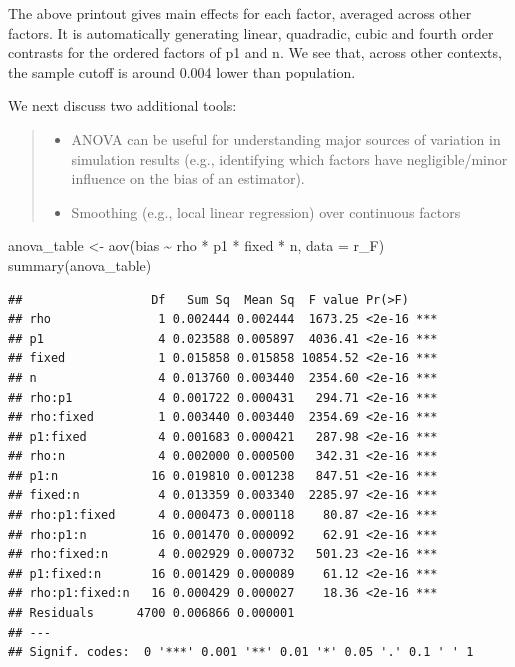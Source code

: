 \documentclass[
]{book}
\newenvironment{Shaded}{\begin{snugshade}}{\end{snugshade}}
\newcommand{\AttributeTok}[1]{\textcolor[rgb]{0.77,0.63,0.00}{#1}}
\newcommand{\FunctionTok}[1]{\textcolor[rgb]{0.00,0.00,0.00}{#1}}
\newcommand{\NormalTok}[1]{#1}
\newcommand{\OtherTok}[1]{\textcolor[rgb]{0.56,0.35,0.01}{#1}}
\newcommand{\SpecialCharTok}[1]{\textcolor[rgb]{0.00,0.00,0.00}{#1}}
\providecommand{\tightlist}{%
  \setlength{\itemsep}{0pt}\setlength{\parskip}{0pt}}
\begin{document}
The above printout gives main effects for each factor, averaged across other factors.
It is automatically generating linear, quadradic, cubic and fourth order contrasts for the ordered factors of p1 and n.
We see that, across other contexts, the sample cutoff is around 0.004 lower than population.

We next discuss two additional tools:

\begin{quote}
\begin{itemize}
\tightlist
\item
  ANOVA can be useful for understanding major sources of variation in simulation results (e.g., identifying which factors have negligible/minor influence on the bias of an estimator).
\item
  Smoothing (e.g., local linear regression) over continuous factors
\end{itemize}
\end{quote}

\begin{Shaded}
\begin{Highlighting}[]
\NormalTok{anova\_table }\OtherTok{\textless{}{-}} \FunctionTok{aov}\NormalTok{(bias }\SpecialCharTok{\textasciitilde{}}\NormalTok{ rho }\SpecialCharTok{*}\NormalTok{ p1 }\SpecialCharTok{*}\NormalTok{ fixed }\SpecialCharTok{*}\NormalTok{ n, }\AttributeTok{data =}\NormalTok{ r\_F)}
\FunctionTok{summary}\NormalTok{(anova\_table)}
\end{Highlighting}
\end{Shaded}

\begin{verbatim}
##                  Df   Sum Sq  Mean Sq  F value Pr(>F)    
## rho               1 0.002444 0.002444  1673.25 <2e-16 ***
## p1                4 0.023588 0.005897  4036.41 <2e-16 ***
## fixed             1 0.015858 0.015858 10854.52 <2e-16 ***
## n                 4 0.013760 0.003440  2354.60 <2e-16 ***
## rho:p1            4 0.001722 0.000431   294.71 <2e-16 ***
## rho:fixed         1 0.003440 0.003440  2354.69 <2e-16 ***
## p1:fixed          4 0.001683 0.000421   287.98 <2e-16 ***
## rho:n             4 0.002000 0.000500   342.31 <2e-16 ***
## p1:n             16 0.019810 0.001238   847.51 <2e-16 ***
## fixed:n           4 0.013359 0.003340  2285.97 <2e-16 ***
## rho:p1:fixed      4 0.000473 0.000118    80.87 <2e-16 ***
## rho:p1:n         16 0.001470 0.000092    62.91 <2e-16 ***
## rho:fixed:n       4 0.002929 0.000732   501.23 <2e-16 ***
## p1:fixed:n       16 0.001429 0.000089    61.12 <2e-16 ***
## rho:p1:fixed:n   16 0.000429 0.000027    18.36 <2e-16 ***
## Residuals      4700 0.006866 0.000001                    
## ---
## Signif. codes:  0 '***' 0.001 '**' 0.01 '*' 0.05 '.' 0.1 ' ' 1
\end{verbatim}
\end{document}
